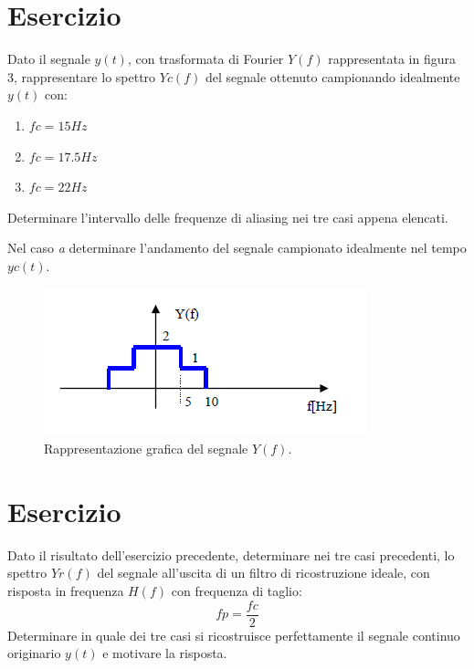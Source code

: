 \documentclass[a4paper]{article}
\begin{document}
	\section{Esercizio}
	
	Dato il segnale $y\left(t\right)$, con trasformata di Fourier $Y\left(f\right)$ rappresentata in figura 3, rappresentare lo spettro $Yc\left(f\right)$ del segnale ottenuto campionando idealmente $y\left(t\right)$ con:
	\begin{enumerate}[label=\alph*)]
		\item $fc = 15 Hz$
		\item $fc = 17.5 Hz$
		\item $fc = 22 Hz$
	\end{enumerate}
	Determinare l'intervallo delle frequenze di aliasing nei tre casi appena elencati.\newline

	\noindent
	Nel caso \emph{a} determinare l'andamento del segnale campionato idealmente nel tempo $yc\left(t\right)$.
	
	\begin{figure}[!htp]
		\centering
		\includegraphics[width=.55\textwidth]{img/fig_3.png}
		\caption{Rappresentazione grafica del segnale $Y\left(f\right)$.}
	\end{figure}

	\section{Esercizio}
	
	Dato il risultato dell'esercizio precedente, determinare nei tre casi precedenti, lo spettro $Yr\left(f\right)$ del segnale all'uscita di un filtro di ricostruzione ideale, con risposta in frequenza $H\left(f\right)$ con frequenza di taglio:
	\begin{equation*}
		fp = \dfrac{fc}{2}
	\end{equation*}
	Determinare in quale dei tre casi si ricostruisce perfettamente il segnale continuo originario $y\left(t\right)$ e motivare la risposta.
\end{document}
